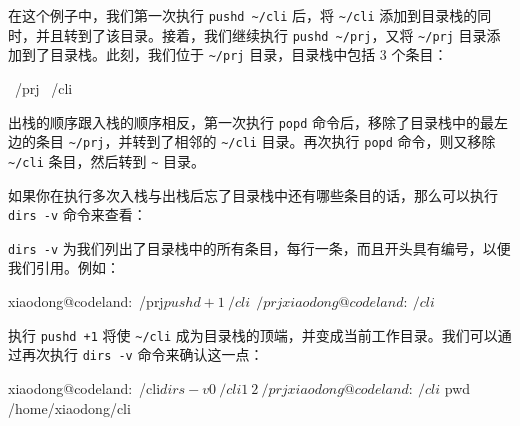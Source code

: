 \documentclass[]{ctexbook}
\newenvironment{Shaded}{\begin{snugshade}}{\end{snugshade}}
\newcommand{\ExtensionTok}[1]{#1}
\newcommand{\NormalTok}[1]{#1}
\begin{document}
在这个例子中，我们第一次执行 \texttt{pushd\ \textasciitilde{}/cli} 后，将 \texttt{\textasciitilde{}/cli} 添加到目录栈的同时，并且转到了该目录。接着，我们继续执行 \texttt{pushd\ \textasciitilde{}/prj}，又将 \texttt{\textasciitilde{}/prj} 目录添加到了目录栈。此刻，我们位于 \texttt{\textasciitilde{}/prj} 目录，目录栈中包括 3 个条目：

\begin{Shaded}
\begin{Highlighting}[]
\ExtensionTok{~/prj}\NormalTok{ ~/cli ~}
\end{Highlighting}
\end{Shaded}

出栈的顺序跟入栈的顺序相反，第一次执行 \texttt{popd} 命令后，移除了目录栈中的最左边的条目 \texttt{\textasciitilde{}/prj}，并转到了相邻的 \texttt{\textasciitilde{}/cli} 目录。再次执行 \texttt{popd} 命令，则又移除 \texttt{\textasciitilde{}/cli} 条目，然后转到 \texttt{\textasciitilde{}} 目录。

如果你在执行多次入栈与出栈后忘了目录栈中还有哪些条目的话，那么可以执行 \texttt{dirs\ -v} 命令来查看：

\begin{Shaded}
\end{Shaded}

\texttt{dirs\ -v} 为我们列出了目录栈中的所有条目，每行一条，而且开头具有编号，以便我们引用。例如：

\begin{Shaded}
\begin{Highlighting}[]
\ExtensionTok{xiaodong@codeland}\NormalTok{:~/prj$ pushd +1}
\ExtensionTok{~/cli}\NormalTok{ ~ ~/prj}
\ExtensionTok{xiaodong@codeland}\NormalTok{:~/cli$}
\end{Highlighting}
\end{Shaded}

执行 \texttt{pushd\ +1} 将使 \texttt{\textasciitilde{}/cli} 成为目录栈的顶端，并变成当前工作目录。我们可以通过再次执行 \texttt{dirs\ -v} 命令来确认这一点：

\begin{Shaded}
\begin{Highlighting}[]
\ExtensionTok{xiaodong@codeland}\NormalTok{:~/cli$ dirs -v}
 \ExtensionTok{0}\NormalTok{  ~/cli}
 \ExtensionTok{1}\NormalTok{  ~}
 \ExtensionTok{2}\NormalTok{  ~/prj}
\ExtensionTok{xiaodong@codeland}\NormalTok{:~/cli$ pwd}
\ExtensionTok{/home/xiaodong/cli}
\end{Highlighting}
\end{Shaded}
\end{document}
